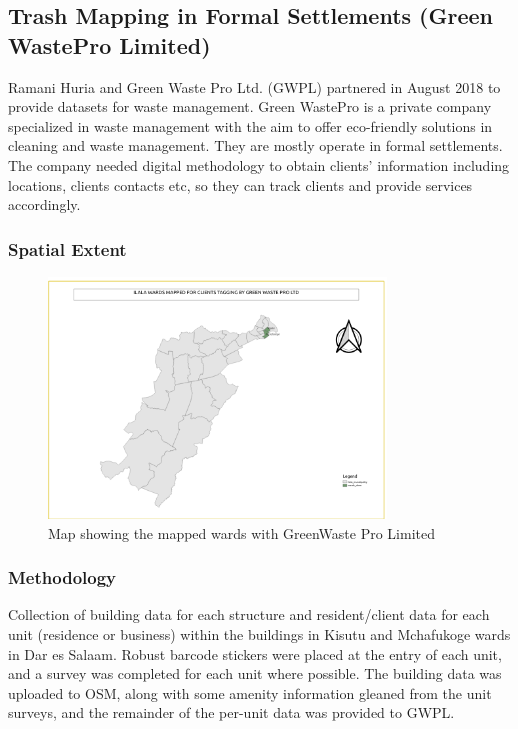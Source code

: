 \documentclass[a4paper,12pt,twoside]{article}
\begin{document}
\newpage
\subsection{Trash Mapping in Formal Settlements (Green WastePro Limited)}

Ramani Huria and Green Waste Pro Ltd. (GWPL) partnered in August 2018 to provide datasets for waste management. Green WastePro is a private company specialized in waste management with the aim to offer eco-friendly solutions in cleaning and waste management. They are mostly operate in formal settlements. The company needed digital methodology to obtain clients’ information including locations, clients contacts etc, so they can track clients and provide services accordingly.

\subsubsection{Spatial Extent}
\begin{figure}[h]
  \color{RHgreen}\caption{Map showing the mapped wards with GreenWaste Pro Limited}
  \centering
  \includegraphics[width=0.8\textwidth]{images/GWPL_trial.png}
\end{figure}

\subsubsection{Methodology}

Collection of building data for each structure and resident/client data for each unit (residence or business) within the buildings in Kisutu and Mchafukoge wards in Dar es Salaam. Robust barcode stickers were placed at the entry of each unit, and a survey was completed for each unit where possible. The building data was uploaded to OSM, along with some amenity information gleaned from the unit surveys, and the remainder of the per-unit data was provided to GWPL.
\end{document}
